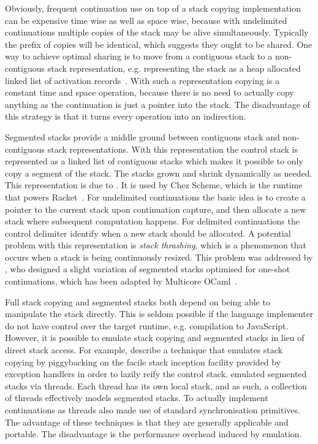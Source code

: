 \documentclass[12pt,phd,lfcs,twoside,openright,logo,leftchapter,normalheadings]{infthesis}
\theoremstyle{plain}
\theoremstyle{definition}
\begin{document}
Obviously, frequent continuation use on top of a stack copying
implementation can be expensive time wise as well as space wise,
because with undelimited continuations multiple copies of the stack
may be alive simultaneously.
%
Typically the prefix of copies will be identical, which suggests they
ought to be shared. One way to achieve optimal sharing is to move from
a contiguous stack to a non-contiguous stack representation,
e.g. representing the stack as a heap allocated linked list of
activation records~\cite{Danvy87}. With such a representation copying
is a constant time and space operation, because there is no need to
actually copy anything as the continuation is just a pointer into the
stack.
%
The disadvantage of this strategy is that it turns every operation
into an indirection.

Segmented stacks provide a middle ground between contiguous stack and
non-contiguous stack representations. With this representation the
control stack is represented as a linked list of contiguous stacks
which makes it possible to only copy a segment of the stack. The
stacks grown and shrink dynamically as needed. This representation is
due to \citet{HiebDB90}. It is used by Chez Scheme, which is the
runtime that powers Racket~\cite{FlattD20}.
%
For undelimited continuations the basic idea is to create a pointer to
the current stack upon continuation capture, and then allocate a new
stack where subsequent computation happens.
%
For delimited continuations the control delimiter identify when a new
stack should be allocated.
%
A potential problem with this representation is \emph{stack
  thrashing}, which is a phenomenon that occurs when a stack is being
continuously resized.
%
This problem was addressed by \citet{BruggemanWD96}, who designed a
slight variation of segmented stacks optimised for one-shot
continuations, which has been adapted by Multicore
OCaml~\cite{DolanEHMSW17}.

Full stack copying and segmented stacks both depend on being able to
manipulate the stack directly. This is seldom possible if the language
implementer do not have control over the target runtime,
e.g. compilation to JavaScript. However, it is possible to emulate
stack copying and segmented stacks in lieu of direct stack access. For
example, \citet{PettyjohnCMKF05} describe a technique that emulates
stack copying by piggybacking on the facile stack inception facility
provided by exception handlers in order to lazily reify the control
stack.
%
\citet{KumarBD98} emulated segmented stacks via threads. Each thread
has its own local stack, and as such, a collection of threads
effectively models segmented stacks. To actually implement
continuations as threads \citeauthor{KumarBD98} also made use of
standard synchronisation primitives.
%
The advantage of these techniques is that they are generally
applicable and portable. The disadvantage is the performance overhead
induced by emulation.
\end{document}
